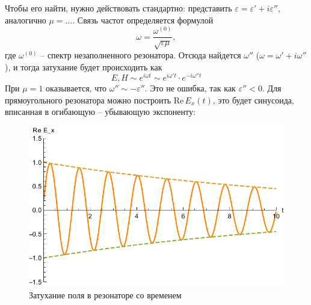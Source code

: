 Чтобы его найти, нужно действовать стандартно: представить 
$\varepsilon=\varepsilon'+i \varepsilon''$, аналогично $\mu=\ldots$. Связь частот определяется формулой
\begin{equation}
	\omega=\frac{\omega^{(0)}}{\sqrt{\varepsilon \mu}},
\end{equation}
где $\omega^{(0)}$ -- спектр незаполненного резонатора. Отсюда найдется $\omega''$ ($\omega=\omega'+i \omega''$), и тогда затухание будет происходить как 
\begin{equation}
	E,H  \sim e^{i \omega t} \sim e^{i \omega' t}\cdot e^{-i \omega'' t}
\end{equation}
При $\mu=1$ оказывается, что $\omega''\sim -\varepsilon''$. Это не ошибка, так как $\varepsilon''<0$. %
Для прямоугольного резонатора можно построить $\mathrm{Re}\, E_x(t)$, это будет синусоида, вписанная в огибающую -- убывающую экспоненту: 
\begin{figure}[H]
	\centering
	\includegraphics[scale=0.8]{img2/exp.pdf}
	\caption{Затухание поля в резонаторе со временем}
	\label{fig:figure1}
\end{figure}